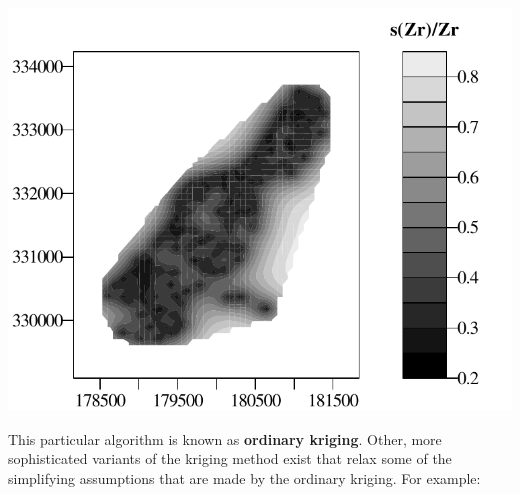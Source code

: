 \noindent\begin{minipage}[t][][b]{.6\textwidth}
\includegraphics[width=\textwidth]{../figures/meusecontourerr.pdf}\\
\end{minipage}
\begin{minipage}[t][][t]{.39\textwidth}
  \label{fig:meusecontourerr}
\end{minipage}

This particular algorithm is known as \textbf{ordinary kriging}.
Other, more sophisticated variants of the kriging method exist that
relax some of the simplifying assumptions that are made by the
ordinary kriging.  For example:


